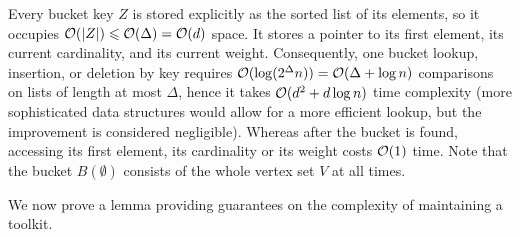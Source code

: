Every bucket key $Z$ is stored explicitly as the sorted list of its elements, so it occupies $\mathcal{O}(|Z|)\leqslant \mathcal{O}(\Delta)=\mathcal{O}(d)$ space. It stores a pointer to its first element, its current cardinality, and its current weight.
Consequently, one bucket lookup, insertion, or deletion by key requires $\mathcal{O}(\log (2^\Delta n))=\mathcal{O}(\Delta+\log n)$ comparisons on lists of length at most $\Delta$, hence it takes $\mathcal{O}(d^2 + d \log n)$ time complexity (more sophisticated data structures would allow for a more efficient lookup, but the improvement is considered negligible). Whereas after the bucket is found, accessing its first element, its cardinality or its weight costs $\mathcal{O}(1)$ time.
Note that the bucket $B(\emptyset)$ consists of the whole vertex set $V$ at all times. 


We now prove a lemma providing guarantees on the complexity of maintaining a toolkit.

